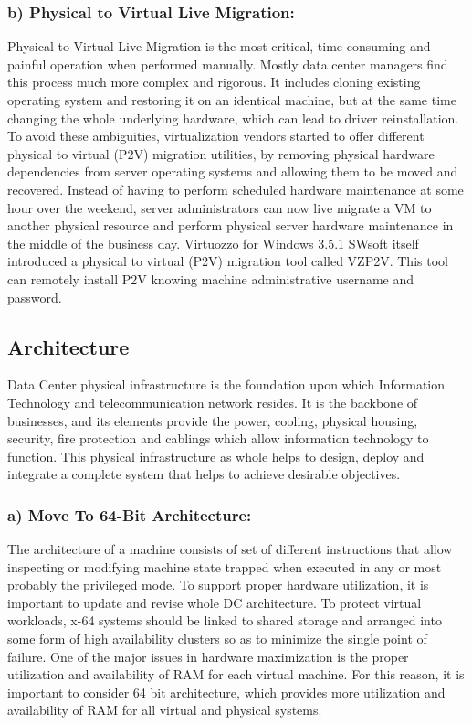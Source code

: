 \documentclass[12pt,a4paper]{report}
\begin{document}
\subsubsection{b) Physical to Virtual Live Migration:}
 Physical to Virtual Live Migration is the most critical, time-consuming and painful operation when performed manually. Mostly data center managers find this process much more complex and rigorous. It includes cloning existing operating system and restoring it on an identical machine, but at the same time changing the whole underlying hardware, which can lead to driver reinstallation. To avoid these ambiguities, virtualization vendors started to offer different physical to virtual (P2V) migration utilities, by removing physical hardware dependencies from server operating systems and allowing them to be moved and recovered. Instead of having to perform scheduled hardware maintenance at some  hour over the weekend, server administrators can now live migrate a VM to another physical resource and perform physical server hardware maintenance in the middle of the business day. Virtuozzo for Windows 3.5.1 SWsoft itself introduced a physical to virtual (P2V) migration tool called VZP2V. This tool can remotely install P2V knowing machine administrative username and password.



\subsection{Architecture}
Data Center physical infrastructure is the foundation upon which Information Technology and telecommunication network resides. It is the backbone of businesses, and its elements provide the power, cooling, physical housing, security, fire protection and cablings which allow information technology to function. This physical infrastructure as whole helps to design, deploy and integrate a complete system that helps to achieve desirable objectives.     
 \subsubsection{a) Move To 64-Bit Architecture:}
  The architecture of a machine consists of set of different instructions that allow inspecting or modifying machine state trapped when executed in any or most probably the privileged mode. To support proper hardware utilization, it is important to update and revise whole DC architecture. To protect virtual workloads, x-64 systems should be linked to shared storage and arranged into some form of high availability clusters so as to minimize the single point of failure. One of the major issues in hardware maximization is the proper utilization and availability of RAM for each virtual machine. For this reason, it is important to consider 64 bit architecture, which provides more utilization and availability of RAM for all virtual and physical systems. 
\end{document}
